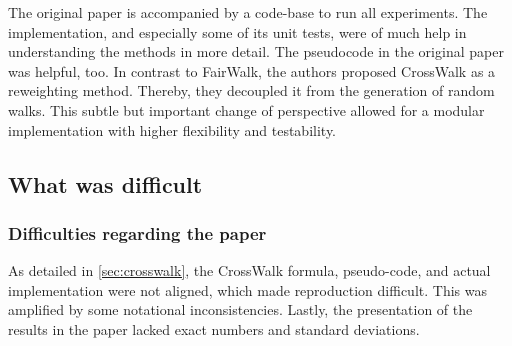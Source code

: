 

The original paper is accompanied by a code-base to run all experiments. The implementation, and especially some of its unit tests, were of much help in understanding the methods in more detail. The pseudocode in the original paper was helpful, too.
In contrast to FairWalk, the authors proposed CrossWalk as a reweighting method. Thereby, they decoupled it from the generation of random walks. This subtle but important change of perspective allowed for a modular implementation with higher flexibility and testability.

\subsection{What was difficult}
\label{subsec:difficult}




\subsubsection*{Difficulties regarding the paper}
As detailed in \autoref{sec:crosswalk}, the CrossWalk formula, pseudo-code, and actual implementation were not aligned, which made reproduction difficult. This was amplified by some notational inconsistencies. Lastly, the presentation of the results in the paper lacked exact numbers and standard deviations. 

